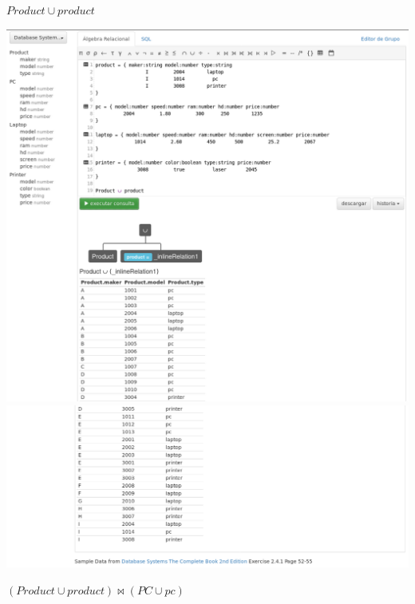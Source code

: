 \documentclass[12pt, letterpaper]{article}
\begin{document}
\begin{itemize}
\begin{itemize}
                                    \newpage

                                    \begin{center}
                                        $Product \cup product$ \vspace{.3cm}

                                        \includegraphics[scale=0.22]{q1.png}
                                        \includegraphics[scale=0.22]{q11.png}
                                    \end{center}

                                    \begin{center}
                                        $(Product \cup product) \Join (PC \cup pc)$\vspace{.3cm}


\end{center}
\end{itemize}
\end{itemize}
\end{document}
